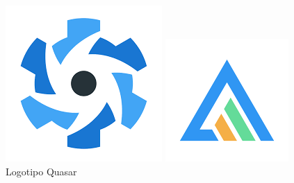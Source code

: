 \documentclass[11pt,spanish,listoffigures,listoftables]{tfgetsinf}
\begin{document}
\begin{figure}[!htb]
     \includegraphics[width=\linewidth]{img/Quasar_logo.png}
     \caption{Logotipo Quasar}\label{fig:LogoQuasar}
     \endminipage\hfill
    \includegraphics[width=\linewidth]{img/apexcharts_logo.png}

\end{figure}
\end{document}
